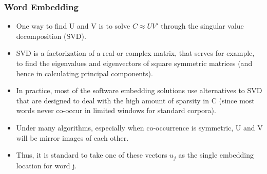 \documentclass[
  shownotes,
  xcolor={svgnames},
  hyperref={colorlinks,citecolor=DarkBlue,linkcolor=DarkRed,urlcolor=DarkBlue}
  , aspectratio=169]{beamer}
\begin{document}
\begin{frame}
\frametitle{Word Embedding }

\begin{itemize}
\item One way to find U and V is to solve $C\approx UV'$ through the singular value decomposition (SVD).
\item SVD is a factorization of a real or complex matrix, that serves for example, to find the eigenvalues and eigenvectors of square symmetric matrices (and hence in calculating principal components). 
\item In practice, most of the software embedding solutions use alternatives to SVD that are designed to deal with the high amount of sparsity in C (since most words never co-occur in limited windows for standard corpora). 

\item Under many algorithms, especially when co-occurrence is symmetric, U and V will be mirror images of each other. 
\item Thus, it is standard to take one of these vectors $u_j$ as the single embedding location for word j.
\end{itemize}


\end{frame}
\end{document}
